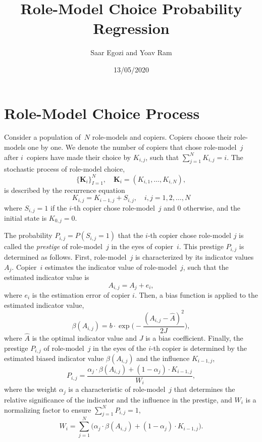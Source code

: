 \documentclass[11pt]{article}
\title{Role-Model Choice Probability Regression}
\author{Saar Egozi and Yoav Ram}
\date{13/05/2020}
\let\vec\mathbf
\begin{document}
\begin{titlepage}
\maketitle
\end{titlepage}

\section*{Role-Model Choice Process}
Consider a population of~$N$ role-models and copiers.
Copiers choose their role-models one by one.
We denote the number of copiers that chose role-model~$j$ after $i$~copiers have made their choice by $K_{i,j}$, such that $\sum_{j=1}^N{K_{i,j}} = i$. 
The stochastic process of role-model choice, 
\begin{equation} \label{eq:process}
\big\{\vec{K}_i\big\}_{I=1}^N, \quad \vec{K}_i=(K_{i,1}, \ldots, K_{i,N}),
\end{equation}
is described by the recurrence equation
\begin{equation} \label{eq:recurrence}
K_{i,j} = K_{i-1,j} + S_{i,j}, \quad i,j=1,2,\ldots,N
\end{equation}
where $S_{i,j}=1$ if the $i$-th copier chose role-model~$j$ and 0 otherwise, and the initial state is $K_{0,j}=0$.

The probability $P_{i,j}=P(S_{i,j}=1)$ that the $i$-th copier chose role-model $j$ is called the \emph{prestige} of role-model~$j$ in the eyes of copier~$i$.
This prestige $P_{i,j}$ is determined as follows.
First, role-model~$j$ is characterized by its indicator values $A_j$.
Copier~$i$ estimates the indicator value of role-model~$j$, such that the estimated indicator value is
\begin{equation}
A_{i,j} = A_j + e_i,
\end{equation}
where $e_i$ is the estimation error of copier $i$. 
Then, a bias function is applied to the estimated indicator value,
\begin{equation}
\beta(A_{i,j}) = b \cdot \exp{\Big(-\frac{(A_{i,j} - \hat{A})^2}{2J}\Big)},
\end{equation}
where $\hat{A}$ is the optimal indicator value and $J$ is a bias coefficient.
Finally, the prestige $P_{i,j}$ of role-model~$j$ in the eyes of the $i$-th copier is determined by the estimated biased indicator value $\beta(A_{i,j})$ and the influence $K_{i-1,j}$, 
\begin{equation}
P_{i,j} = \frac{\alpha_j \cdot \beta(A_{i,j}) + (1-\alpha_j) \cdot K_{i-1,j}}{W_i},
\end{equation}
where the weight $\alpha_j$ is a characteristic of role-model~$j$ that determines the relative significance of the indicator and the influence in the prestige, and $W_i$ is a normalizing factor to ensure $\sum_{j=1}^N{P_{i,j}}=1$,
\begin{equation}
W_i = \sum_{j=1}^N{\Big(\alpha_j \cdot \beta(A_{i,j}) + (1-\alpha_j) \cdot K_{i-1,j}\Big)}.
\end{equation}
\end{document}
